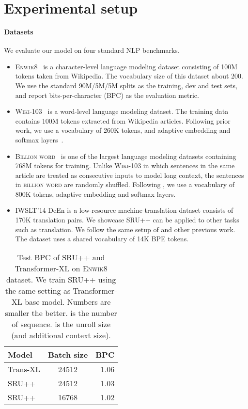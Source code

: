 
\section{Experimental setup}
\label{sec:setup}

\paragraph{Datasets}
We evaluate our model on four standard NLP benchmarks.
\begin{itemize}
    \item \textsc{Enwik8}~\cite{hutter2012human} is a character-level language modeling dataset consisting of 100M tokens taken from Wikipedia. 
    The vocabulary size of this dataset about 200.
    We use the standard 90M/5M/5M splits as the training, dev and test sets, and report bits-per-character (BPC) as the evaluation metric.
\item \textsc{Wiki-103}~\cite{merity2016pointer} is a word-level language modeling dataset. The training data contains 100M tokens extracted from Wikipedia articles. 
    Following prior work, we use a vocabulary of 260K tokens, and adaptive embedding and softmax layers~\cite{grave2017efficient,baevski2018adaptive}.
\item \textsc{Billion word}~\cite{billionword} is one of the largest language modeling datasets containing 768M tokens for training.
    Unlike \textsc{Wiki-103} in which sentences in the same article are treated as consecutive inputs to model long context, the sentences in \textsc{billion word} are randomly shuffled.
    Following \citet{baevski2018adaptive}, we use a vocabulary of 800K tokens, adaptive embedding and softmax layers. 
    \item \textsc{IWSLT}'14 DeEn is a low-resource machine translation dataset consists of 170K translation pairs.
    We showcase SRU++ can be applied to other tasks such as translation.
    We follow the same setup of \citet{lin-etal-2020-autoregressive} and other previous work.
    The dataset uses a shared vocabulary of 14K BPE tokens.
\end{itemize}

\begin{table}[t!]
    \centering
    \begin{tabular}{lcr}
        \toprule
\bf Model & \bf Batch size  & \bf BPC  \\
        \hline
        Trans-XL & 24512 & 1.06 \\
        SRU++ &  24512 & 1.03 \\
        SRU++ &  16768 & 1.02 \\
        \bottomrule
    \end{tabular}
    \caption{Test BPC of SRU++ and Transformer-XL on \textsc{Enwik8} dataset. We train SRU++ using the same setting as Transformer-XL base model. 
Numbers are smaller the better.
     is the number of sequence.  is the unroll size (and additional context size).}
    \label{tab:enwik8_base}
\end{table}


